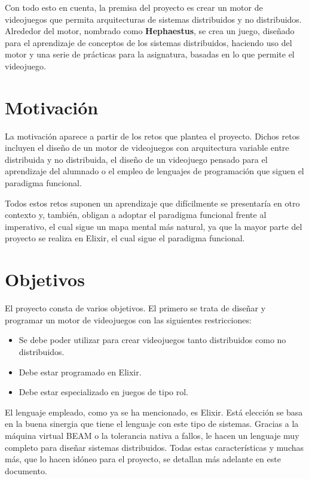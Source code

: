 Con todo esto en cuenta, la premisa del proyecto es crear un motor de videojuegos que permita arquitecturas de sistemas distribuidos y no distribuidos. Alrededor del motor, nombrado como \textbf{Hephaestus}, se crea un juego, diseñado para el aprendizaje de conceptos de los sistemas distribuidos, haciendo uso del motor y una serie de prácticas para la asignatura, basadas en lo que permite el videojuego.

\section{Motivación}

La motivación aparece a partir de los retos que plantea el proyecto. Dichos retos incluyen el diseño de un motor de videojuegos con arquitectura variable entre distribuida y no distribuida, el diseño de un videojuego pensado para el aprendizaje del alumnado o el empleo de lenguajes de programación que siguen el paradigma funcional.

Todos estos retos suponen un aprendizaje que difícilmente se presentaría en otro contexto y, también, obligan a adoptar el paradigma funcional frente al imperativo, el cual sigue un mapa mental más natural, ya que la mayor parte del proyecto se realiza en Elixir, el cual sigue el paradigma funcional.

\section{Objetivos} \label{objetivos}

El proyecto consta de varios objetivos. El primero se trata de diseñar y programar un motor de videojuegos con las siguientes restricciones:

\begin{itemize}
	\item Se debe poder utilizar para crear videojuegos tanto distribuidos como no distribuidos.
	\item Debe estar programado en Elixir.
	\item Debe estar especializado en juegos de tipo rol. 
\end{itemize}

El lenguaje empleado, como ya se ha mencionado, es Elixir. Está elección se basa en la buena sinergia que tiene el lenguaje con este tipo de sistemas. Gracias a la máquina virtual BEAM o la tolerancia nativa a fallos, le hacen un lenguaje muy completo para diseñar sistemas distribuidos. Todas estas características y muchas más, que lo hacen idóneo para el proyecto, se detallan más adelante en este documento.

